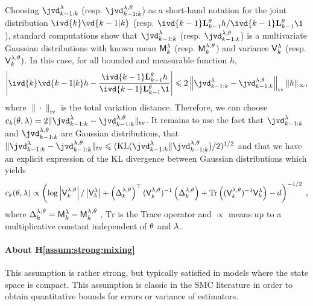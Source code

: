 \documentclass{article}
\begin{document}
Choosing $\jvd_{k-1:k}^\parvar$  (resp. $\jvd_{k-1:k}^{\parvar,\parvec}$) as a  short-hand notation for the joint distribution $\ivd{k}\vd{k-1 \vert k} $ (resp. $\ivd{k-1} \uk{k-1}{\parvec}h/\ivd{k-1} \uk{k-1}{\parvec}\1$), standard computations show that $\jvd_{k-1:k}^\parvar$ (resp. $\jvd_{k-1:k}^{\parvar, \parvec}$) is a  multivariate Gaussian distributions with known mean $\mathsf{M}_{k}^{\lambda}$ (resp. $\mathsf{M}_{k}^{\lambda,\theta}$) and variance 
$\mathsf{V}_{k}^{\lambda}$ (resp. $\mathsf{V}_{k}^{\lambda,\theta})$. In this case, for all bounded and measurable function $h$,
$$
\left|\ivd{k}\vd{k-1 \vert k} h - \frac{\ivd{k-1} \uk{k-1}{\parvec}h}{\ivd{k-1} \uk{k-1}{\parvec}\1}\right| \leqslant 2 \left\|\jvd_{k-1:k}^\parvar - \jvd_{k-1:k}^{\parvar,\parvec}\right\|_{\mathrm{tv}} \| h \|_\infty,
$$ 
where $\|\cdot\|_{\mathrm{tv}}$ is the total variation distance. 
Therefore, we can choose $c_k(\parvec,\parvar) = 2 \|\jvd_{k-1:k}^\parvar - \jvd_{k-1:k}^{\parvar,\parvec}\|_{\mathrm{tv}}$. 
It remains to use the fact that $\jvd_{k-1:k}^\parvar$  and $\jvd_{k-1:k}^{\parvar,\parvec}$ are Gaussian distributions, that $\|\jvd_{k-1:k}^\parvar - \jvd_{k-1:k}^{\parvar,\parvec}\|_{\mathrm{tv}} \leqslant (\mathrm{KL}(\jvd_{k-1:k}^\parvar \| \jvd_{k-1:k}^{\parvar,\parvec})/2)^{1/2}$ and that we have an explicit expression of the $\mathrm{KL}$ divergence between Gaussian  distributions which yields
\begin{multline*}
c_k(\theta,\lambda) \propto \left(\log \left| \mathsf{V}_{k}^{\lambda,\theta}\right|/\left| \mathsf{V}_{k}^{\lambda}\right| + \left(\Delta_k^{\lambda,\theta}\right)^\top(\mathsf{V}_{k}^{\lambda,\theta})^{-1}\left(\Delta_k^{\lambda,\theta}\right)
 + \mathrm{Tr}\left( (\mathsf{V}_{k}^{\lambda, \theta})^{-1}\mathsf{V}_{k}^{\lambda}\right) - d\right)^{-1/2}\;,
\end{multline*}
where $\Delta_k^{\lambda,\theta} = \mathsf{M}_{k}^{\lambda} - \mathsf{M}_{k}^{\lambda,\theta}$ , $ \mathrm{Tr}$ is the Trace operator and $\propto$ means up to a multiplicative constant independent of $\theta$ and $\lambda$.

\paragraph{About \textbf{H\ref{assum:strong:mixing}}}
This assumption is rather strong, but typically satisfied in models where the state space  is compact. This assumption is classic in the SMC literature in order to obtain quantitative bounds for errors or variance of estimators.
\end{document}
